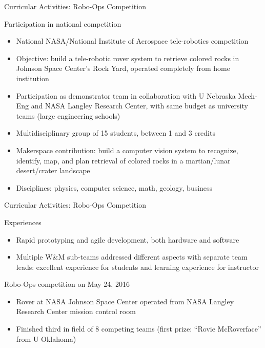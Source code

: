 \documentclass[xcolor={dvipsnames},professionalfonts]{beamer}
\begin{document}
\begin{frame}{Curricular Activities: Robo-Ops Competition}
 \begin{block}{Participation in national competition}
  \begin{itemize}
   \item National NASA/National Institute of Aerospace tele-robotics competition
   \item Objective: build a tele-robotic rover system to retrieve colored rocks in Johnson Space Center's Rock Yard, operated completely from home institution
   \item Participation as demonstrator team in collaboration with U Nebraska Mech-Eng and NASA Langley Research Center, with same budget as university teams (large engineering schools)
   \item Multidisciplinary group of 15 students, between 1 and 3 credits
   \item Makerspace contribution: build a computer vision system to recognize, identify, map, and plan retrieval of colored rocks in a martian/lunar desert/crater landscape
   \item Disciplines: physics, computer science, math, geology, business
  \end{itemize}
 \end{block}
\end{frame}

\begin{frame}{Curricular Activities: Robo-Ops Competition}
 \begin{block}{Experiences}
  \begin{itemize}
   \item Rapid prototyping and agile development, both hardware and software
   \item Multiple W\&M sub-teams addressed different aspects with separate team leads: excellent experience for students and learning experience for instructor
  \end{itemize}
 \end{block}
 \begin{block}{Robo-Ops competition on May 24, 2016}
  \begin{itemize}
   \item Rover at NASA Johnson Space Center operated from NASA Langley Research Center mission control room
   \item Finished third in field of 8 competing teams (first prize: ``Rovie McRoverface'' from U Oklahoma)
  \end{itemize}
 \end{block}
\end{frame}
\end{document}
